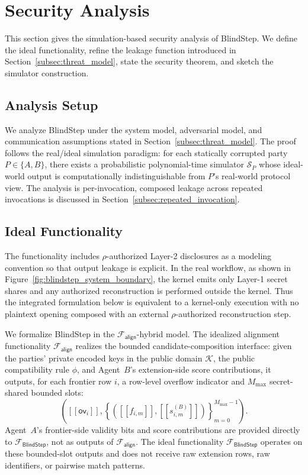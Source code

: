 \documentclass[conference,compsoc,letterpaper]{IEEEtran}
\theoremstyle{definition}
\theoremstyle{remark}
\newcommand{\BlindStep}{BlindStep\xspace}
\newcommand{\FBlindStep}{\mathcal{F}_{\textsf{BlindStep}}}
\newcommand{\Sim}{\mathcal{S}}              %
\newcommand{\share}[1]{[\![#1]\!]}           %
\newcommand{\Falign}{\mathcal{F}_{\mathsf{align}}}
\newcommand{\Mmax}{M_{\max}}
\newcommand{\compat}{\phi}
\newcommand{\policy}{\rho}
\newcommand{\overflow}{\mathsf{ov}}
\begin{document}
\section{Security Analysis}
\label{sec:security}

This section gives the simulation-based security analysis of \BlindStep{}.
We define the ideal functionality, refine the leakage function introduced in Section~\ref{subsec:threat_model}, state the security theorem, and sketch the simulator construction.
\subsection{Analysis Setup}
\label{subsec:security_model}

We analyze \BlindStep{} under the system model, adversarial model, and communication assumptions stated in Section~\ref{subsec:threat_model}.
The proof follows the real/ideal simulation paradigm: for each statically corrupted party $P\in\{A,B\}$, there exists a probabilistic polynomial-time simulator $\Sim_P$ whose ideal-world output is computationally indistinguishable from $P$'s real-world protocol view.
The analysis is per-invocation, composed leakage across repeated invocations is discussed in Section~\ref{subsec:repeated_invocation}.
\subsection{Ideal Functionality}
\label{subsec:functionality}

The functionality includes $\policy$-authorized Layer-2 disclosures as a modeling convention so that output leakage is explicit.
In the real workflow, as shown in Figure~\ref{fig:blindstep_system_boundary}, the kernel emits only Layer-1 secret shares and any authorized reconstruction is performed outside the kernel.
Thus the integrated formulation below is equivalent to a kernel-only execution with no plaintext opening composed with an external $\policy$-authorized reconstruction step.

We formalize \BlindStep{} in the $\Falign{}$-hybrid model.
The idealized alignment functionality $\Falign{}$ realizes the bounded candidate-composition interface: given the parties' private encoded keys in the public domain $\mathcal K$, the public compatibility rule $\compat$, and Agent~$B$'s extension-side score contributions, it outputs, for each frontier row $i$, a row-level overflow indicator and $\Mmax$ secret-shared bounded slots:
\[
\left(
\share{\overflow_i},
\left\{
\left(
\share{f_{i,m}},
\share{s^{(B)}_{i,m}}
\right)
\right\}_{m=0}^{\Mmax-1}
\right).
\]
Agent~$A$'s frontier-side validity bits and score contributions are provided directly to $\FBlindStep$, not as outputs of $\Falign{}$.
The ideal functionality $\FBlindStep$ operates on these bounded-slot outputs and does not receive raw extension rows, raw identifiers, or pairwise match patterns.
\end{document}
